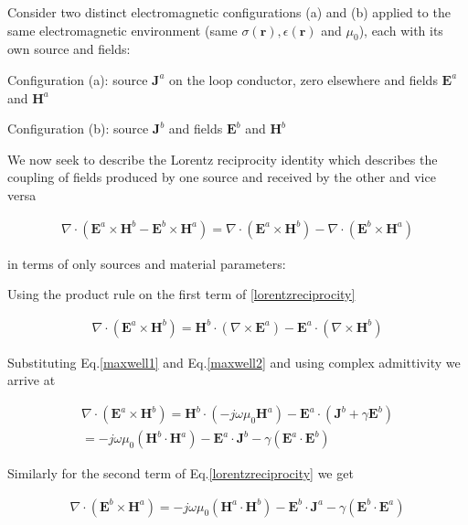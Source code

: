 Consider two distinct electromagnetic configurations (a) and (b) applied to the same electromagnetic environment (same $\sigma(\mathbf{r}), \epsilon(\mathbf{r})$ and $\mu_0$), each with its own source and fields:

Configuration (a): source $\mathbf{J}^a$ on the loop conductor, zero elsewhere and fields $\mathbf{E}^a$ and $\mathbf{H}^a$

Configuration (b): source $\mathbf{J}^b$ and fields $\mathbf{E}^b$ and $\mathbf{H}^b$

We now seek to describe the Lorentz reciprocity identity which describes the coupling of fields produced by one source and received by the other and vice versa

\begin{align}
    \label{lorentzreciprocity}
    \nabla \cdot (\mathbf{E}^a \times \mathbf{H}^b - \mathbf{E}^b \times \mathbf{H}^a) = \nabla \cdot(\mathbf{E}^a \times \mathbf{H}^b) - \nabla \cdot(\mathbf{E}^b \times \mathbf{H}^a)
\end{align}

in terms of only sources and material parameters:

Using the product rule on the first term of \eqref{lorentzreciprocity}

\begin{align}
    \nabla \cdot(\mathbf{E}^a \times \mathbf{H}^b) = \mathbf{H}^b \cdot (\nabla \times \mathbf{E}^a) - \mathbf{E}^a \cdot (\nabla \times \mathbf{H}^b)
\end{align}

Substituting Eq.\eqref{maxwell1} and Eq.\eqref{maxwell2} and using complex admittivity we arrive at 

\begin{align}
    \nabla \cdot(\mathbf{E}^a \times \mathbf{H}^b) = \mathbf{H}^b \cdot (-j \omega \mu_0 \mathbf{H}^a) - \mathbf{E}^a \cdot (\mathbf{J}^b + \gamma \mathbf{E}^b) \\
    = -j \omega \mu_0 (\mathbf{H}^b \cdot \mathbf{H}^a) - \mathbf{E}^a \cdot \mathbf{J}^b - \gamma(\mathbf{E}^a \cdot \mathbf{E}^b)
\end{align}

Similarly for the second term of Eq.\eqref{lorentzreciprocity} we get

\begin{align}
    \nabla \cdot(\mathbf{E}^b \times \mathbf{H}^a) = -j \omega \mu_0 (\mathbf{H}^a \cdot \mathbf{H}^b) - \mathbf{E}^b \cdot \mathbf{J}^a - \gamma(\mathbf{E}^b \cdot \mathbf{E}^a)
\end{align}

